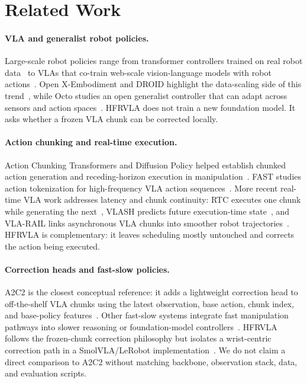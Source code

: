 \documentclass[10pt]{article}
\newcommand{\method}{HFRVLA}
\newcommand{\smolvla}{SmolVLA}
\begin{document}
\section{Related Work}

\paragraph{VLA and generalist robot policies.}
Large-scale robot policies range from transformer controllers trained on real robot data~\citep{brohan2022rt1} to VLAs that co-train web-scale vision-language models with robot actions~\citep{brohan2023rt2,kim2024openvla,black2024pi0,shukor2025smolvla}. Open X-Embodiment and DROID highlight the data-scaling side of this trend~\citep{openx2024,khazatsky2024droid}, while Octo studies an open generalist controller that can adapt across sensors and action spaces~\citep{ghosh2024octo}. \method{} does not train a new foundation model. It asks whether a frozen VLA chunk can be corrected locally.

\paragraph{Action chunking and real-time execution.}
Action Chunking Transformers and Diffusion Policy helped establish chunked action generation and receding-horizon execution in manipulation~\citep{zhao2023aloha,chi2023diffusionpolicy}. FAST studies action tokenization for high-frequency VLA action sequences~\citep{pertsch2025fast}. More recent real-time VLA work addresses latency and chunk continuity: RTC executes one chunk while generating the next~\citep{black2025rtc}, VLASH predicts future execution-time state~\citep{tang2025vlash}, and VLA-RAIL links asynchronous VLA chunks into smoother robot trajectories~\citep{zhao2025vlarail}. \method{} is complementary: it leaves scheduling mostly untouched and corrects the action being executed.

\paragraph{Correction heads and fast-slow policies.}
A2C2 is the closest conceptual reference: it adds a lightweight correction head to off-the-shelf VLA chunks using the latest observation, base action, chunk index, and base-policy features~\citep{sendai2025a2c2}. Other fast-slow systems integrate fast manipulation pathways into slower reasoning or foundation-model controllers~\citep{chen2025fastinslow,zou2025duocorefs,xue2025rdp,xie2026dynamicvla}. \method{} follows the frozen-chunk correction philosophy but isolates a wrist-centric correction path in a \smolvla{}/LeRobot implementation~\citep{cadene2026lerobot}. We do not claim a direct comparison to A2C2 without matching backbone, observation stack, data, and evaluation scripts.
\end{document}
